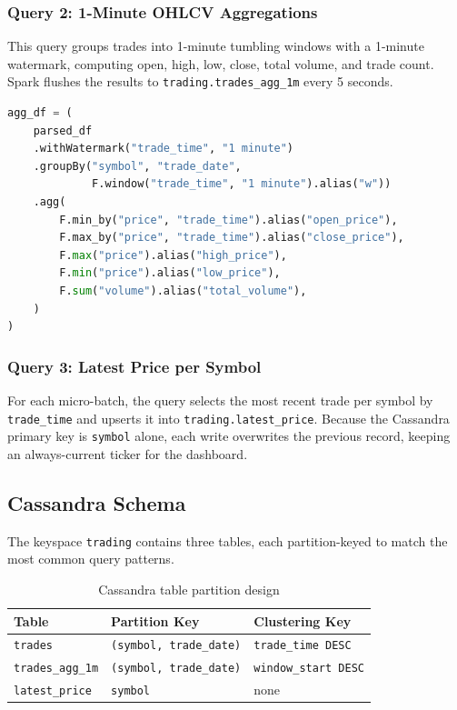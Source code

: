 \documentclass[a4paper]{article}
\begin{document}
\subsubsection{Query 2: 1-Minute OHLCV Aggregations}
This query groups trades into 1-minute tumbling windows with a 1-minute watermark,
computing open, high, low, close, total volume, and trade count. Spark flushes
the results to \texttt{trading.trades\_agg\_1m} every 5 seconds.

\begin{lstlisting}[language=Python]
agg_df = (
    parsed_df
    .withWatermark("trade_time", "1 minute")
    .groupBy("symbol", "trade_date",
             F.window("trade_time", "1 minute").alias("w"))
    .agg(
        F.min_by("price", "trade_time").alias("open_price"),
        F.max_by("price", "trade_time").alias("close_price"),
        F.max("price").alias("high_price"),
        F.min("price").alias("low_price"),
        F.sum("volume").alias("total_volume"),
    )
)
\end{lstlisting}

\subsubsection{Query 3: Latest Price per Symbol}
For each micro-batch, the query selects the most recent trade per symbol by
\texttt{trade\_time} and upserts it into \texttt{trading.latest\_price}. Because
the Cassandra primary key is \texttt{symbol} alone, each write overwrites the
previous record, keeping an always-current ticker for the dashboard.

\subsection{Cassandra Schema}

The keyspace \texttt{trading} contains three tables, each partition-keyed to
match the most common query patterns.

\begin{table}[H]
\centering
\begin{tabular}{|l|l|l|}
\hline
\textbf{Table} & \textbf{Partition Key} & \textbf{Clustering Key} \\
\hline
\texttt{trades} & \texttt{(symbol, trade\_date)} & \texttt{trade\_time DESC} \\
\hline
\texttt{trades\_agg\_1m} & \texttt{(symbol, trade\_date)} & \texttt{window\_start DESC} \\
\hline
\texttt{latest\_price} & \texttt{symbol} & none \\
\hline
\end{tabular}
\caption{Cassandra table partition design}
\end{table}
\end{document}
